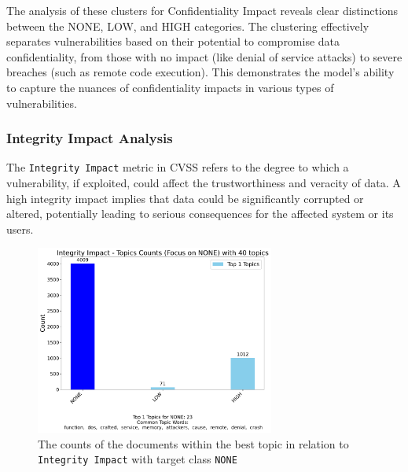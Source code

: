\documentclass[12pt]{article}
\begin{document}
The analysis of these clusters for Confidentiality Impact reveals clear distinctions between the
NONE, LOW, and HIGH categories. The clustering effectively separates vulnerabilities based on their
potential to compromise data confidentiality, from those with no impact (like denial of service
attacks) to severe breaches (such as remote code execution). This demonstrates the model's ability
to capture the nuances of confidentiality impacts in various types of vulnerabilities.

\subsubsection{Integrity Impact Analysis}

The \texttt{Integrity Impact} metric in CVSS refers to the degree to which a vulnerability, if exploited,
could affect the trustworthiness and veracity of data. A high integrity impact implies that data
could be significantly corrupted or altered, potentially leading to serious consequences for the
affected system or its users.

\begin{figure}[H]
	\centering
	\includegraphics[width=0.7\textwidth]{figures/integrityImpact/merged_top_k_topics_category_focus_counts_integrityImpact_NONE_k1.pdf}
	\caption{The counts of the documents within the best topic in relation to \texttt{Integrity
			Impact} with
		target class \texttt{NONE}}

	\label{fig:integrityImpact_60_NONE}

\end{figure}
\end{document}
